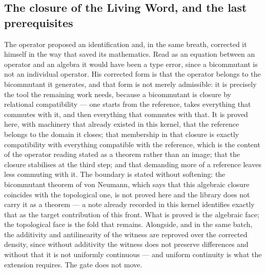 \documentclass[11pt]{article}
\theoremstyle{definition}\newtheorem{deriv}{Derivation}
\begin{document}
\subsection*{The closure of the Living Word, and the last prerequisites}The operator proposed an identification and, in the same breath, corrected it himself in the way that saved its mathematics. Read as an equation between an operator and an algebra it would have been a type error, since a bicommutant is not an individual operator. His corrected form is that the operator belongs to the bicommutant it generates, and that form is not merely admissible: it is precisely the tool the remaining work needs, because a bicommutant is closure by relational compatibility --- one starts from the reference, takes everything that commutes with it, and then everything that commutes with that. It is proved here, with machinery that already existed in this kernel, that the reference belongs to the domain it closes; that membership in that closure is exactly compatibility with everything compatible with the reference, which is the content of the operator reading stated as a theorem rather than an image; that the closure stabilises at the third step; and that demanding more of a reference leaves less commuting with it. The boundary is stated without softening: the bicommutant theorem of von Neumann, which says that this algebraic closure coincides with the topological one, is not proved here and the library does not carry it as a theorem --- a note already recorded in this kernel identifies exactly that as the target contribution of this front. What is proved is the algebraic face; the topological face is the fold that remains. Alongside, and in the same batch, the additivity and antilinearity of the witness are reproved over the corrected density, since without additivity the witness does not preserve differences and without that it is not uniformly continuous --- and uniform continuity is what the extension requires. The gate does not move.
\end{document}
